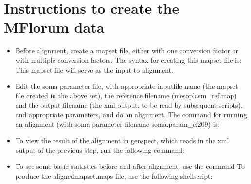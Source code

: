 \documentclass[11pt]{article}
\begin{document}
\section{Instructions to create the MFlorum data}
\begin{itemize}
\item
Before alignment, create a mapset file, either with one conversion factor or with multiple conversion factors. The syntax for creating this mapset file is:
This mapset file will serve as the input to alignment.
\item
Edit the soma parameter file, with appropriate inputfile name (the mapset file created in the above set), the reference filename (mesoplasm\_ref.map) and the output filename (the xml output, to be read by subsequent scripts), and appropriate parameters, and do an alignment. The command for running an alignment (with soma parameter filename soma.param\_cf209) is:
\item
To view the result of the alignment in genspect, which reads in the xml output of the previous step, run the following command:
\item
To see some basic statistics before and after alignment, use the command 
To produce the alignedmapset.maps file, use the following shellscript:


\end{itemize}
\end{document}
